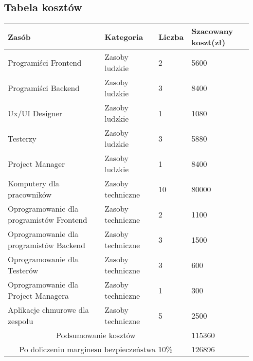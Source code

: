 \documentclass[a4paper,12pt]{article}
\begin{document}
    \subsection{Tabela kosztów}\label{subsec:tabela-kosztow}
    \begin{table}[ht]
        \centering
        \renewcommand{\arraystretch}{1.4}
        \begin{tabular}{|m{8.2cm}|m{3.4cm}|m{1.4cm}|m{2cm}|}
            \hline
            \rowcolor{yellow!30}
            Zasób & Kategoria & Liczba & Szacowany koszt(zł) \\
            \hline
            Programiści Frontend & Zasoby ludzkie & 2 & 5600 \\
            \hline
            Programiści Backend & Zasoby ludzkie & 3 & 8400 \\
            \hline
            Ux/UI Designer & Zasoby ludzkie & 1 & 1080 \\
            \hline
            Testerzy & Zasoby ludzkie & 3 & 5880 \\
            \hline
            Project Manager & Zasoby ludzkie & 1 & 8400 \\
            \hline
            Komputery dla pracowników & Zasoby techniczne & 10 & 80000 \\
            \hline
            Oprogramowanie dla programistów Frontend & Zasoby techniczne & 2 & 1100 \\
            \hline
            Oprogramowanie dla programistów Backend & Zasoby techniczne & 3 & 1500 \\
            \hline
            Oprogramowanie dla Testerów & Zasoby techniczne & 3 & 600 \\
            \hline
            Oprogramowanie dla Project Managera & Zasoby techniczne & 1 & 300 \\
            \hline
            Aplikacje chmurowe dla zespołu & Zasoby techniczne & 5 & 2500 \\
            \hline
            \multicolumn{3}{|c|}{Podsumowanie kosztów} & 115360 \\
            \hline
            \multicolumn{3}{|c|}{Po doliczeniu marginesu bezpieczeństwa 10\%} & 126896 \\
            \hline

        \end{tabular}
    \end{table}
\end{document}
